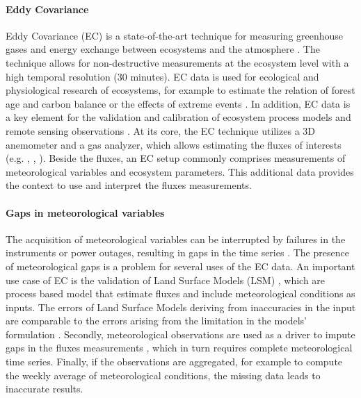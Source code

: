 \documentclass{article}
\begin{document}
\paragraph{Eddy Covariance} Eddy Covariance (EC) is a state-of-the-art technique for measuring greenhouse gases and energy exchange between ecosystems and the atmosphere \cite{aubinet_eddy_2012-1}.  The technique allows for non-destructive measurements at the ecosystem level with a high temporal resolution (30 minutes). EC data is used for ecological and physiological research of ecosystems, for example to estimate the relation of forest age and carbon balance \cite{besnard_quantifying_2018} or the effects of extreme events \cite{mahecha_detecting_2017}. In addition, EC data is a key element for the validation and calibration of ecosystem process models and remote sensing observations \cite{papale_ideas_2020}.
At its core, the EC technique utilizes a 3D anemometer and a gas analyzer, which allows estimating the fluxes of interests (e.g. , , ). Beside the fluxes, an EC setup commonly comprises measurements of meteorological variables and ecosystem parameters. This additional data provides the context to use and interpret the fluxes measurements.

\paragraph{Gaps in meteorological variables} The acquisition of  meteorological variables can be interrupted by failures in the instruments or power outages, resulting in gaps in the time series \cite{aubinet_eddy_2012-1}.
The presence of meteorological gaps is a problem for several uses of the EC data. An important use case of EC is the validation of Land Surface Models (LSM) \cite{balzarolo_evaluating_2014, friend_fluxnet_2007-1, bonan_improving_2011-1, kramer_evaluation_2002}, which are process based model that estimate fluxes and include meteorological conditions as inputs. The errors of Land Surface Models deriving from inaccuracies in the input are comparable to the errors arising from the limitation in the models' formulation \cite{zhao_how_2012}. 
Secondly, meteorological observations are used as a driver to impute gaps in the fluxes measurements \cite{aubinet_eddy_2012-1}, which in turn requires complete meteorological time series.
Finally, if the observations are aggregated, for example to compute the weekly average of meteorological conditions, the missing data leads to inaccurate results. 
\end{document}
